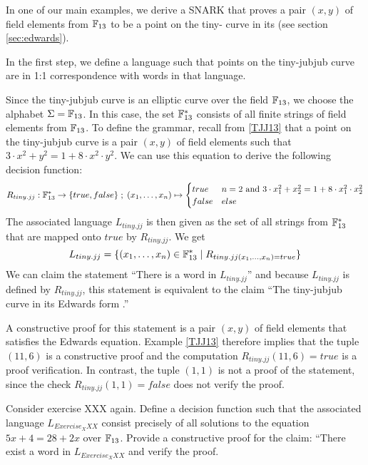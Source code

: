 \begin{example}\label{ex:tiny-jubjub} In one of our main examples, we derive a SNARK that proves a pair $(x,y)$ of field elements from $\mathbb{F}_{13}$ to be a point on the tiny- curve in its  (see section \ref{sec:edwards}).

In the first step, we define a language such that points on the tiny-jubjub curve are in 1:1 correspondence with words in that language.

Since the tiny-jubjub curve is an elliptic curve over the field $\mathbb{F}_{13}$, we choose the alphabet $\Sigma = \mathbb{F}_{13}$. In this case, the set $\mathbb{F}_{13}^*$ consists of all finite strings of field elements from $\mathbb{F}_{13}$. To define the grammar, recall from \ref{TJJ13} that a point on the tiny-jubjub curve is a pair $(x,y)$ of field elements such that $3\cdot x^2 + y^2 = 1+ 8\cdot x^2\cdot y^2$. We can use this equation to derive the following decision function:
$$
R_{tiny.jj} : \mathbb{F}_{13}^* \to \{true, false\}\;;\;
(x_1,\ldots,x_n) \mapsto
\begin{cases}
true & n=2 \text{ and } 3\cdot x_1^2 + x_2^2 = 1+ 8\cdot x_1^2\cdot x_2^2\\
false & else
\end{cases}
$$
The associated language $L_{tiny.jj}$ is then given as the set of all strings from $\mathbb{F}_{13}^*$ that are mapped onto $true$ by $R_{tiny.jj}$. We get
$$
L_{tiny.jj} = \{(x_1,\ldots,x_n)\in \mathbb{F}_{13}^*\;|\; R_{tiny.jj(x_1,\ldots,x_n)=true}\}
$$
We can claim the statement ``There is a word in $L_{tiny.jj}$'' and because $L_{tiny.jj}$ is defined by $R_{tiny.jj}$, this statement is equivalent to the claim ``The tiny-jubjub curve in its Edwards form .'' 

A constructive proof for this statement is a pair $(x,y)$ of field elements that satisfies the Edwards equation. Example \ref{TJJ13} therefore implies that the tuple $(11,6)$ is a constructive proof and the computation $R_{tiny.jj}(11,6)=true$ is a proof verification. In contrast, the tuple $(1,1)$ is not a proof of the statement, since the check $R_{tiny.jj}(1,1)=false$ does not verify the proof.
\end{example}
\begin{exercise} Consider exercise XXX again. Define a decision function such that the associated language $L_{Exercise_XXX}$ consist precisely of all solutions to the equation $5x + 4 = 28 + 2x$ over $\mathbb{F}_{13}$. Provide a constructive proof for the claim: ``There exist a word in $L_{Exercise_XXX}$ and verify the proof.  
\end{exercise}
